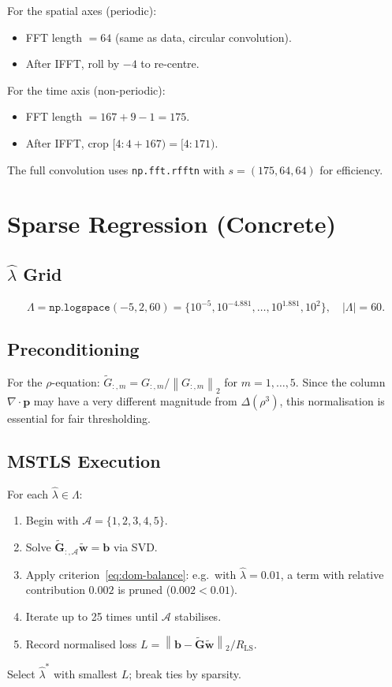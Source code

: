 \documentclass[11pt, letterpaper]{article}
\theoremstyle{definition}
\newcommand{\vp}{\mathbf{p}}
\newcommand{\vw}{\mathbf{w}}
\newcommand{\vb}{\mathbf{b}}
\newcommand{\vG}{\mathbf{G}}
\newcommand{\norm}[1]{\left\lVert #1 \right\rVert}
\newcommand{\lap}{\Delta}
\newcommand{\divop}{\nabla\!\cdot}
\begin{document}
For the spatial axes (periodic):
\begin{itemize}[nosep]
  \item FFT length $= 64$ (same as data, circular convolution).
  \item After IFFT, roll by $-4$ to re-centre.
\end{itemize}

For the time axis (non-periodic):
\begin{itemize}[nosep]
  \item FFT length $= 167 + 9 - 1 = 175$.
  \item After IFFT, crop $[4 : 4 + 167) = [4 : 171)$.
\end{itemize}

The full convolution uses \texttt{np.fft.rfftn} with
$s = (175, 64, 64)$ for efficiency.

\section{Sparse Regression (Concrete)}
\label{sec:concrete-regression}

\subsection{$\hat\lambda$ Grid}
\begin{equation}
  \Lambda = \texttt{np.logspace}(-5, 2, 60)
  = \{10^{-5}, 10^{-4.881}, \dots, 10^{1.881}, 10^{2}\},
  \quad |\Lambda| = 60.
\end{equation}

\subsection{Preconditioning}
For the $\rho$-equation: $\tilde{G}_{:,m} = G_{:,m} / \norm{G_{:,m}}_2$
for $m = 1, \dots, 5$.  Since the column $\divop\vp$ may have a very
different magnitude from $\lap(\rho^3)$, this normalisation is
essential for fair thresholding.

\subsection{MSTLS Execution}
For each $\hat\lambda \in \Lambda$:
\begin{enumerate}[nosep]
  \item Begin with $\mathcal{A} = \{1,2,3,4,5\}$.
  \item Solve $\tilde{\vG}_{:,\mathcal{A}}\tilde{\vw} = \vb$ via SVD.
  \item Apply criterion~\eqref{eq:dom-balance}: e.g.\ with
    $\hat\lambda = 0.01$, a term with relative contribution $0.002$
    is pruned ($0.002 < 0.01$).
  \item Iterate up to 25 times until $\mathcal{A}$ stabilises.
  \item Record normalised loss
    $L = \norm{\vb - \tilde{\vG}\tilde{\vw}}_2 / R_{\mathrm{LS}}$.
\end{enumerate}
Select $\hat\lambda^{*}$ with smallest $L$; break ties by sparsity.
\end{document}
